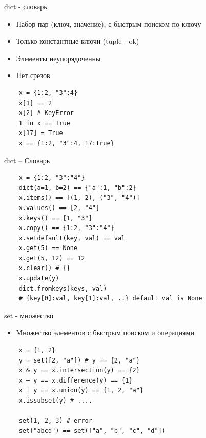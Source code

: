 \documentclass{article}
\begin{document}
\begin{center} dict - словарь \end{center}
\begin{itemize}
	\item Набор пар (ключ, значение), с быстрым поиском по ключу
	\item Только константные ключи (tuple - ok)
	\item Элементы неупорядоченны
	\item Нет срезов
\end{itemize}
\vspace{15pt}
\begin{lstlisting}
    x = {1:2, "3":4}
	x[1] == 2
	x[2] # KeyError
	1 in x == True
	x[17] = True
	x == {1:2, "3":4, 17:True}
\end{lstlisting}
\newpage

\begin{center} dict – Словарь \end{center}
\vspace{15pt}
\begin{lstlisting}
	x = {1:2, "3":"4"}
	dict(a=1, b=2) == {"a":1, "b":2}
	x.items() == [(1, 2), ("3", "4")]
	x.values() == [2, "4"]
	x.keys() == [1, "3"]
	x.copy() == {1:2, "3":"4"}
	x.setdefault(key, val) == val
	x.get(5) == None
	x.get(5, 12) == 12
	x.clear() # {}
	x.update(y)
	dict.fromkeys(keys, val) 
	# {key[0]:val, key[1]:val, ..} default val is None
\end{lstlisting}
\newpage

\begin{center} set - множество \end{center}
\begin{itemize}
	\item Множество элементов с быстрым поиском и операциями
\end{itemize}
\vspace{15pt}
\begin{lstlisting}
	x = {1, 2} 
	y = set([2, "a"]) # y == {2, "a"}
	x & y == x.intersection(y) == {2}
	x – y == x.difference(y) == {1}
	x | y == x.union(y) == {1, 2, "a"}
	x.issubset(y) # ....

	set(1, 2, 3) # error
	set("abcd") == set(["a", "b", "c", "d"])
\end{lstlisting}
\newpage
\end{document}
